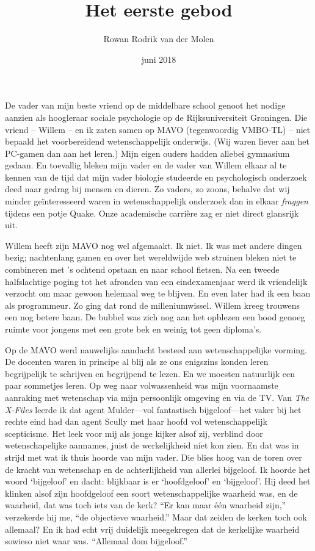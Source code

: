 \documentclass[12pt,a4paper]{article}
\begin{document}
\title{Het eerste gebod}
\author{Rowan Rodrik van der Molen}
\date{juni 2018}
\maketitle


De vader van mijn beste vriend op de middelbare school genoot het nodige aanzien als hoogleraar sociale psychologie op de Rijksuniversiteit Groningen. Die vriend – Willem – en ik zaten samen op MAVO (tegenwoordig VMBO-TL) – niet bepaald het voorbereidend wetenschappelijk onderwijs. (Wij waren liever aan het PC-gamen dan aan het leren.) Mijn eigen ouders hadden allebei gymnasium gedaan. En toevallig bleken mijn vader en de vader van Willem elkaar al te kennen van de tijd dat mijn vader biologie studeerde en psychologisch onderzoek deed naar gedrag bij mensen en dieren. Zo vaders, zo zoons, behalve dat wij minder geïnteresseerd waren in wetenschappelijk onderzoek dan in elkaar \emph{fraggen} tijdens een potje Quake. Onze academische carrière zag er niet direct glansrijk uit.

Willem heeft zijn MAVO nog wel afgemaakt. Ik niet. Ik was met andere dingen bezig; nachtenlang gamen en over het wereldwijde web struinen bleken niet te combineren met 's ochtend opstaan en naar school fietsen. Na een tweede halfslachtige poging tot het afronden van een eindexamenjaar werd ik vriendelijk verzocht om maar gewoon helemaal weg te blijven. En even later had ik een baan als programmeur. Zo ging dat rond de milleniumwissel. Willem kreeg trouwens een nog betere baan. De bubbel was zich nog aan het opblezen een bood genoeg ruimte voor jongens met een grote bek en weinig tot geen diploma's.

Op de MAVO werd nauwelijks aandacht besteed aan wetenschappelijke vorming. De docenten waren in principe al blij als ze ons enigszins konden leren begrijpelijk te schrijven en begrijpend te lezen. En we moesten natuurlijk een paar sommetjes leren. Op weg naar volwassenheid was mijn voornaamste aanraking met wetenschap via mijn persoonlijk omgeving en via de TV. Van \emph{The X-Files} leerde ik dat agent Mulder—vol fantastisch bijgeloof—het vaker bij het rechte eind had dan agent Scully met haar hoofd vol wetenschappelijk scepticisme. Het leek voor mij als jonge kijker alsof zij, verblind door wetenschapelijke aannames, juist de werkelijkheid níet kon zien. En dat was in strijd met wat ik thuis hoorde van mijn vader. Die blies hoog van de toren over de kracht van wetenschap en de achterlijkheid van allerlei bijgeloof. Ik hoorde het woord ‘bijgeloof’ en dacht: blijkbaar is er ‘hoofdgeloof’ en ‘bijgeloof’. Hij deed het klinken alsof zijn hoofdgeloof een soort wetenschappelijke waarheid was, en de waarheid, dat was toch iets van de kerk? “Er kan maar één waarheid zijn,” verzekerde hij me, “de objectieve waarheid.” Maar dat zeiden de kerken toch ook allemaal? En ik had echt vrij duidelijk meegekregen dat de kerkelijke waarheid sowieso niet waar was. “Allemaal dom bijgeloof.”
\end{document}
